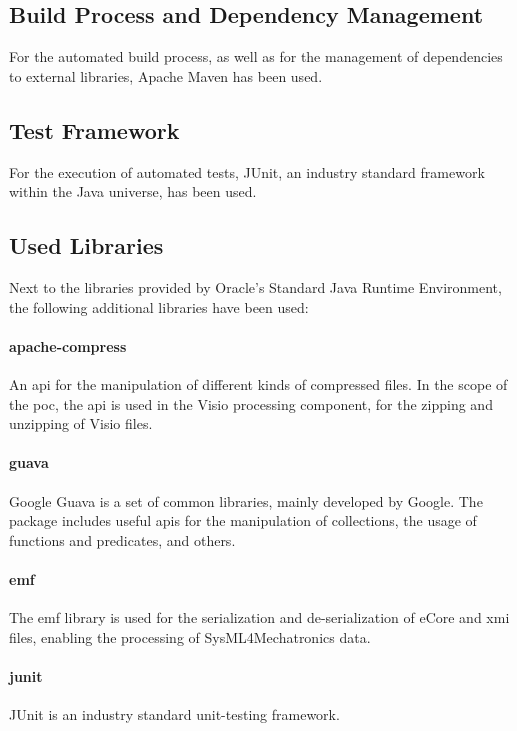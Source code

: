 \subsection{Build Process and Dependency Management}

For the automated build process, as well as for the management of dependencies to external libraries, Apache Maven\cite{ref:maven} has been used.

\subsection{Test Framework}

For the execution of automated tests, JUnit\cite{ref:junit}, an industry standard framework within the Java universe, has been used.

\subsection{Used Libraries}

Next to the libraries provided by Oracle's Standard Java Runtime Environment, the following additional libraries have been used:

\paragraph{apache-compress \cite{ref:compress}} An \gls{api} for the manipulation of different kinds of compressed files. In the scope of the \gls{poc}, the \gls{api} is used in the Visio \cite{ref:visio} processing component, for the zipping and unzipping of Visio files.

\paragraph{guava \cite{ref:guava}} Google Guava is a set of common libraries, mainly developed by Google. The package includes useful \glspl{api} for the manipulation of collections, the usage of functions and predicates, and others.

\paragraph{emf \cite{ref:emf}} The \gls{emf} library is used for the serialization and de-serialization of eCore \cite{ref:emf} and \gls{xmi} \cite{ref:xmi} files, enabling the processing of SysML4Mechatronics data.

\paragraph{junit} JUnit is an industry standard unit-testing framework.

